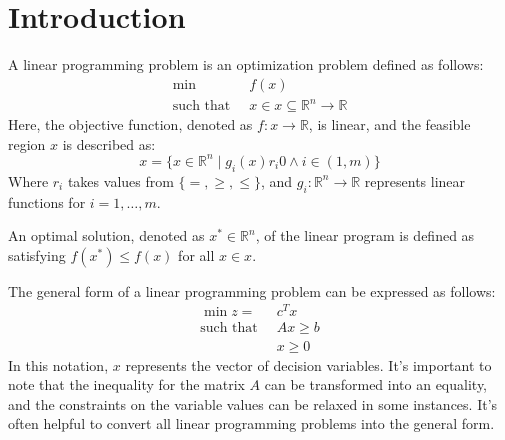\section{Introduction}

\begin{definition}
    A linear programming problem is an optimization problem defined as follows:
    \begin{align*}
        \min                      \:&\:f(x)           \\
        \text{such that }     &\: x \in x \subseteq \mathbb{R}^n \rightarrow \mathbb{R} 
    \end{align*}
    Here, the objective function, denoted as $f:x \rightarrow \mathbb{R}$, is linear, and the feasible region $x$ is described as:
    \[x=\{x\in\mathbb{R}^n\mid g_i(x)r_i0\land i\in(1,m)\}\]
    Where $r_i$ takes values from $\{=,\geq,\leq\}$, and $g_i:\mathbb{R}^n\rightarrow\mathbb{R}$ represents linear functions for $i=1,\dots,m$.
\end{definition}
\begin{definition}
    An optimal solution, denoted as $x^{\ast} \in \mathbb{R}^n$, of the linear program is defined as satisfying $f(x^{\ast}) \leq f(x)$ for all $x\in x$.
\end{definition}
The general form of a linear programming problem can be expressed as follows:
\begin{align*}
    \min{z}=                  \:&\: c^Tx           \\
    \text{such that }     &\: Ax \geq b       \\
                                &\: x \geq 0 
\end{align*}
In this notation, $x$ represents the vector of decision variables.
It's important to note that the inequality for the matrix $A$ can be transformed into an equality, and the constraints on the variable values can be relaxed in some instances.
It's often helpful to convert all linear programming problems into the general form.

